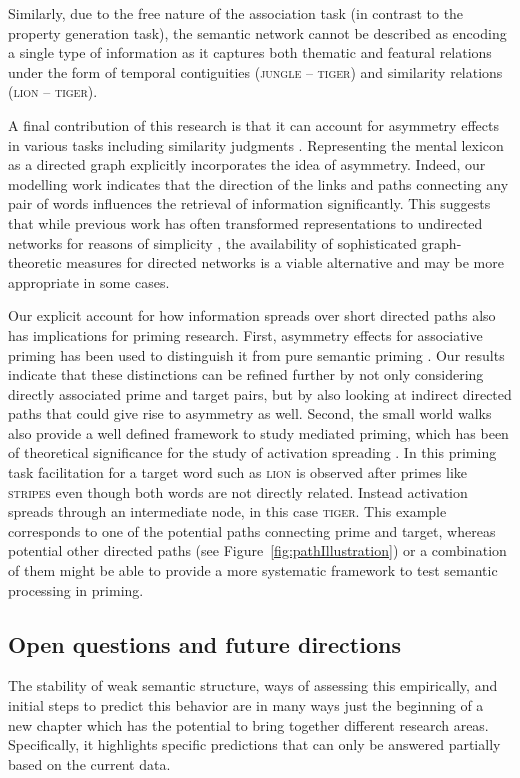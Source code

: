 \documentclass[doc]{apa6}
\newcommand{\stimulus}[1]{\textsc{#1}}
\begin{document}
Similarly, due to the free nature of the association task (in contrast to the property generation task), the semantic network cannot be described as encoding a single type of information as it captures both thematic and featural relations under the form of temporal contiguities (\stimulus{jungle} -- \stimulus{tiger}) and similarity relations (\stimulus{lion} -- \stimulus{tiger}).

A final contribution of this research is that it can account for asymmetry effects in various tasks including similarity judgments \parencite[e.g.,][]{Tversky1977}. Representing the mental lexicon as a directed graph explicitly incorporates the idea of asymmetry. Indeed, our modelling work indicates that the direction of the links and paths connecting any pair of words influences the retrieval of information significantly. This suggests that while previous work has often transformed representations to undirected networks for reasons of simplicity \parencite[e.g.,][]{Steyvers2004}, the availability of sophisticated graph-theoretic measures for directed networks is a viable alternative and may be more appropriate in some cases.

Our explicit account for how information spreads over short directed paths also has implications for priming research. First, asymmetry effects for associative priming has been used to distinguish it from pure semantic priming \parencite{Thompson-Schill1998}. Our results indicate that these distinctions can be refined further by not only considering directly associated prime and target pairs, but by also looking at indirect directed paths that could give rise to asymmetry as well.
Second, the small world walks also provide a well defined framework to study mediated priming, which has been of theoretical significance for the study of activation spreading \parencite{Hutchison2003}. In this priming task facilitation for a target word such as \stimulus{lion} is observed after primes like \stimulus{stripes} even though both words are not directly related. Instead activation spreads through an intermediate node, in this case \stimulus{tiger}. This example corresponds to one of the potential paths connecting prime and target, whereas potential other directed paths (see Figure~\ref{fig:pathIllustration}) or a combination of them might be able to provide a more systematic framework to test semantic processing in priming.

\bigskip

\subsection{Open questions and future directions}
The stability of weak semantic structure, ways of assessing this empirically, and initial steps to predict this behavior are in many ways just the beginning of a new chapter which has the potential to bring together different research areas.
Specifically, it highlights specific predictions that can only be answered partially based on the current data.
\end{document}
